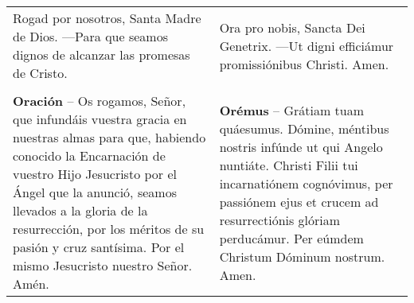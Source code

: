 \begin{longtable} { p{} p{} }
    Rogad por nosotros, Santa Madre de Dios. ---Para que seamos dignos de alcanzar las promesas de Cristo.                   
    
     & 
    
    Ora pro nobis, Sancta Dei Genetrix. ---Ut digni efficiámur promissiónibus Christi. Amen. \\\\
    \textbf{Oración} -- Os rogamos, Señor, que infundáis vuestra gracia en nuestras almas para que,
    habiendo conocido la Encarnación de vuestro Hijo Jesucristo por el Ángel que la anunció,
    seamos llevados a la gloria de la resurrección, por los méritos de su pasión y cruz santísima.
    Por el mismo Jesucristo nuestro Señor. Amén.                  
    
     &

    \textbf{Orémus} -- Grátiam tuam quáesumus. Dómine, méntibus nostris infúnde ut qui Angelo nuntiáte.
    Christi Filii tui incarnatiónem cognóvimus, per passiónem ejus et crucem ad resurrectiónis glóriam perducámur.
    Per eúmdem Christum Dóminum nostrum. Amen.
\end{longtable}

